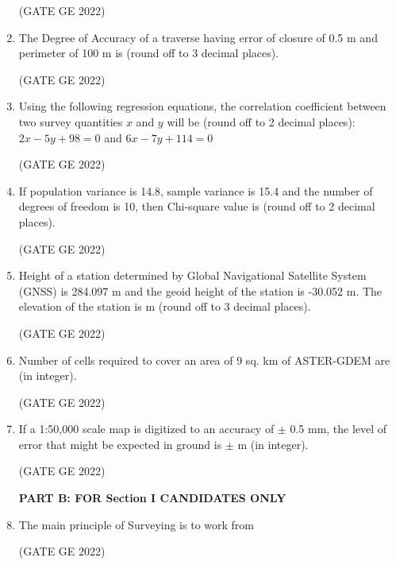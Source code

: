 \documentclass[journal,12pt,onecolumn]{IEEEtran}
\theoremstyle{remark}
\begin{document}
\begin{enumerate}
\hfill (GATE GE 2022)

\item The Degree of Accuracy of a traverse having error of closure of 0.5 m and perimeter of 100 m is \makebox[1cm]{\hrulefill} (round off to 3 decimal places).

\hfill (GATE GE 2022)

\item Using the following regression equations, the correlation coefficient between two survey quantities $x$ and $y$ will be \makebox[1cm]{\hrulefill} (round off to 2 decimal places): $2x - 5y + 98 = 0$ and $6x - 7y + 114 = 0$

\hfill (GATE GE 2022)

\item If population variance is 14.8, sample variance is 15.4 and the number of degrees of freedom is 10, then Chi-square value is \makebox[1cm]{\hrulefill} (round off to 2 decimal places).

\hfill (GATE GE 2022)

\item Height of a station determined by Global Navigational Satellite System (GNSS) is 284.097 m and the geoid height of the station is -30.052 m. The elevation of the station is \makebox[1cm]{\hrulefill} m (round off to 3 decimal places).

\hfill (GATE GE 2022)

\item Number of cells required to cover an area of 9 sq. km of ASTER-GDEM are \makebox[1cm]{\hrulefill} (in integer).

\hfill (GATE GE 2022)

\item If a 1:50,000 scale map is digitized to an accuracy of $\pm$ 0.5 mm, the level of error that might be expected in ground is $\pm$ \makebox[1cm]{\hrulefill} m (in integer).

\hfill (GATE GE 2022)

\textbf{PART B: FOR Section I CANDIDATES ONLY}

\item The main principle of Surveying is to work from

\hfill (GATE GE 2022)

\begin{enumerate}
\end{enumerate}


\end{enumerate}
\end{document}
